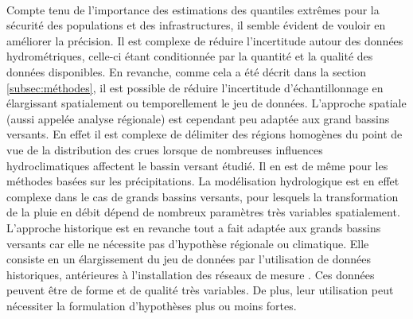 \documentclass[11pt]{article}
\begin{document}
	\paragraph{} Compte tenu de l'importance des estimations des quantiles extrêmes pour la sécurité des populations et des infrastructures, il semble évident de vouloir en améliorer la précision. Il est complexe de réduire l'incertitude autour des données hydrométriques, celle-ci étant conditionnée par la quantité et la qualité des données disponibles. En revanche, comme cela a été décrit dans la section \ref{subsec:méthodes}, il est possible de réduire l'incertitude d'échantillonnage en élargissant spatialement ou temporellement le jeu de données. L'approche spatiale (aussi appelée analyse régionale) est cependant peu adaptée aux grand bassins versants. En effet il est complexe de délimiter des régions homogènes du point de vue de la distribution des crues lorsque de nombreuses influences hydroclimatiques affectent le bassin versant étudié. Il en est de même pour les méthodes basées sur les précipitations. La modélisation hydrologique est en effet complexe dans le cas de grands bassins versants, pour lesquels la transformation de la pluie en débit dépend de nombreux paramètres très variables spatialement. L'approche historique est en revanche tout a fait adaptée aux grands bassins versants car elle ne nécessite pas d'hypothèse régionale ou climatique. Elle consiste en un élargissement du jeu de données par l'utilisation de données historiques, antérieures à l'installation des réseaux de mesure \citep{brazdil_historical_2006}. Ces données peuvent être de forme et de qualité très variables. De plus, leur utilisation peut nécessiter la formulation d'hypothèses plus ou moins fortes. 
	
\end{document}
